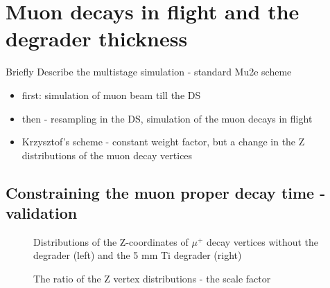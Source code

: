 \section {Muon decays in flight and the degrader thickness}

{\red Briefly Describe the multistage simulation - standard Mu2e scheme
  \begin{itemize}
  \item
    first: simulation of muon beam till the DS
  \item
    then - resampling in the DS, simulation of the muon decays in flight
  \item
    Krzysztof's scheme - constant weight factor, but a change in the Z distributions
    of the muon decay vertices
  \end{itemize}
}


\subsection {Constraining the muon proper decay time - validation}

\begin{figure}[H]
  \caption{
    \label{fig:pion_stop_time}
    Distributions of the Z-coordinates of $\mu^+$ decay vertices without the degrader (left)
    and the 5 mm Ti degrader (right)
  }
\end{figure}

\begin{figure}[H]
  \caption{
    \label{fig:pion_stop_time}
    The ratio of the Z vertex distributions - the scale factor
  }
\end{figure}


